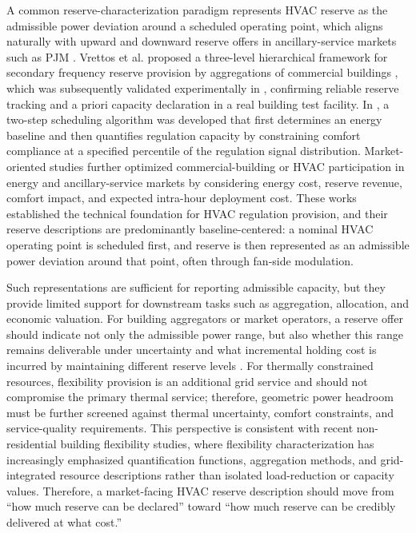 \documentclass[journal]{IEEEtran}
\theoremstyle{remark}
\begin{document}
	A common reserve-characterization paradigm represents HVAC reserve as the admissible power deviation around a scheduled operating point, which aligns naturally with upward and downward reserve offers in ancillary-service markets such as PJM \cite{pjm2021manual11}. Vrettos et al. proposed a three-level hierarchical framework for secondary frequency reserve provision by aggregations of commercial buildings \cite{vrettos2015scheduling}, which was subsequently validated experimentally in \cite{vrettos2016experimental, vrettos2016experimental2}, confirming reliable reserve tracking and a priori capacity declaration in a real building test facility. In \cite{liu2017evaluation}, a two-step scheduling algorithm was developed that first determines an energy baseline and then quantifies regulation capacity by constraining comfort compliance at a specified percentile of the regulation signal distribution. Market-oriented studies further optimized commercial-building or HVAC participation in energy and ancillary-service markets by considering energy cost, reserve revenue, comfort impact, and expected intra-hour deployment cost\cite{aslam2023optimal}. These works established the technical foundation for HVAC regulation provision, and their reserve descriptions are predominantly baseline-centered: a nominal HVAC operating point is scheduled first, and reserve is then represented as an admissible power deviation around that point, often through fan-side modulation.
	
	Such representations are sufficient for reporting admissible capacity, but they provide limited support for downstream tasks such as aggregation, allocation, and economic valuation. For building aggregators or market operators, a reserve offer should indicate not only the admissible power range, but also whether this range remains deliverable under uncertainty\cite{liu2024continuous} and what incremental holding cost is incurred by maintaining different reserve levels \cite{chen2024aggregating}. For thermally constrained resources, flexibility provision is an additional grid service and should not compromise the primary thermal service; therefore, geometric power headroom must be further screened against thermal uncertainty, comfort constraints, and service-quality requirements\cite{maitanova2024analytical}. This perspective is consistent with recent non-residential building flexibility studies, where flexibility characterization has increasingly emphasized quantification functions, aggregation methods, and grid-integrated resource descriptions rather than isolated load-reduction or capacity values\cite{zhou2025demand}. Therefore, a market-facing HVAC reserve description should move from “how much reserve can be declared” toward “how much reserve can be credibly delivered at what cost.” 
	
\end{document}
